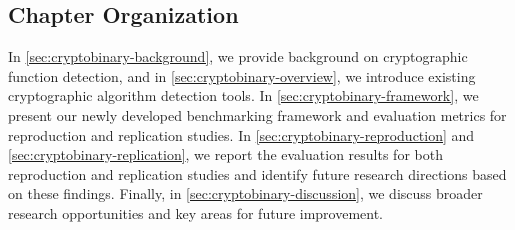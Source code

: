 
\subsection{Chapter Organization}
In \autoref{sec:cryptobinary-background}, we provide background on cryptographic function detection, and in \autoref{sec:cryptobinary-overview}, we introduce existing cryptographic algorithm detection tools. In \autoref{sec:cryptobinary-framework}, we present our newly developed benchmarking framework and evaluation metrics for reproduction and replication studies. In \autoref{sec:cryptobinary-reproduction} and \autoref{sec:cryptobinary-replication}, we report the evaluation results for both reproduction and replication studies and identify future research directions based on these findings. Finally, in \autoref{sec:cryptobinary-discussion}, we discuss broader research opportunities and key areas for future improvement.

